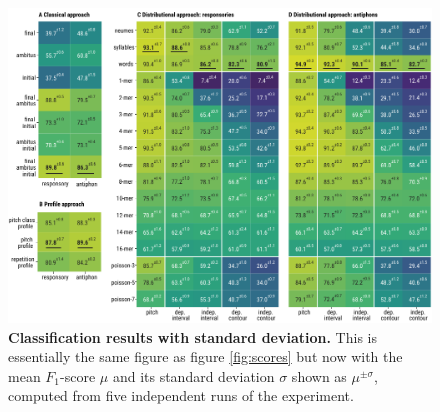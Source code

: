 \documentclass{article}
\begin{document}
\begin{figure}
    \centering
    \includegraphics{figs/figS12-full-results-stddev.pdf}
    \caption{
        \textbf{Classification results with standard deviation.}
        This is essentially the same figure as figure \ref{fig:scores} but now with the mean $F_1$-score $\mu$ and its standard deviation $\sigma$ shown as $\mu^{\pm\sigma}$, computed from five independent runs of the experiment.
        \label{suppl:results-full-stddev}
    }
\end{figure}
\end{document}
